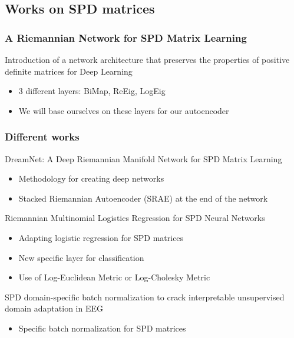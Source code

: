 \documentclass{beamer}
\begin{document}
\subsection{Works on SPD matrices}
\begin{frame}
\frametitle{A Riemannian Network for SPD Matrix Learning}
Introduction of a network architecture that preserves the properties of positive definite matrices for Deep Learning \cite{DBLP:journals/corr/HuangG16}
\begin{itemize}
    \item 3 different layers: BiMap, ReEig, LogEig
    \item We will base ourselves on these layers for our autoencoder    
\end{itemize}

\end{frame}
\begin{frame}
    \frametitle{Different works}
    DreamNet: A Deep Riemannian Manifold Network for SPD Matrix Learning \cite{wang2022dreamnetdeepriemanniannetwork}
    \begin{itemize}
        \item Methodology for creating deep networks
        \item Stacked Riemannian Autoencoder (SRAE) at the end of the network
    \end{itemize}
    Riemannian Multinomial Logistics Regression for SPD Neural Networks \cite{chen2024riemannianmultinomiallogisticsregression}
    \begin{itemize}
        \item Adapting logistic regression for SPD matrices
        \item New specific layer for classification
        \item Use of Log-Euclidean Metric or Log-Cholesky Metric
    \end{itemize}
    SPD domain-specific batch normalization to crack interpretable unsupervised domain adaptation in EEG \cite{kobler2022spddomainspecificbatchnormalization}
    \begin{itemize}
        \item Specific batch normalization for SPD matrices
    \end{itemize}
\end{frame}
\end{document}
